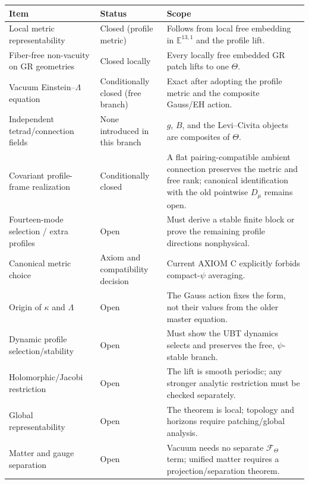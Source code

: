 \documentclass[11pt,a4paper]{article}
\theoremstyle{remark}
\begin{document}
\begin{center}
\begin{tabularx}{\textwidth}{>{\raggedright\arraybackslash}p{}
                              >{\raggedright\arraybackslash}p{}
                              >{\raggedright\arraybackslash}X}
\hline
Item & Status & Scope \\
\hline
Local metric representability & Closed (profile metric) & Follows from local free embedding in $\mathbb E^{13,1}$ and the profile lift. \\
Fiber-free non-vacuity on GR geometries & Closed locally & Every locally free embedded GR patch lifts to one $\Theta$. \\
Vacuum Einstein--$\Lambda$ equation & Conditionally closed (free branch) & Exact after adopting the profile metric and the composite Gauss/EH action. \\
Independent tetrad/connection fields & None introduced in this branch & $g$, $B$, and the Levi--Civita objects are composites of $\Theta$. \\
Covariant profile-frame realization & Conditionally closed & A flat pairing-compatible ambient connection preserves the metric and free rank; canonical identification with the old pointwise $D_\mu$ remains open. \\
Fourteen-mode selection / extra profiles & Open & Must derive a stable finite block or prove the remaining profile directions nonphysical. \\
Canonical metric choice & Axiom and compatibility decision & Current AXIOM C explicitly forbids compact-$\psi$ averaging. \\
Origin of $\kappa$ and $\Lambda$ & Open & The Gauss action fixes the form, not their values from the older master equation. \\
Dynamic profile selection/stability & Open & Must show the UBT dynamics selects and preserves the free, $\psi$-stable branch. \\
Holomorphic/Jacobi restriction & Open & The lift is smooth periodic; any stronger analytic restriction must be checked separately. \\
Global representability & Open & The theorem is local; topology and horizons require patching/global analysis. \\
Matter and gauge separation & Open & Vacuum needs no separate $\mathcal F_\Theta$ term; unified matter requires a projection/separation theorem. \\
\hline
\end{tabularx}
\end{center}
\end{document}

